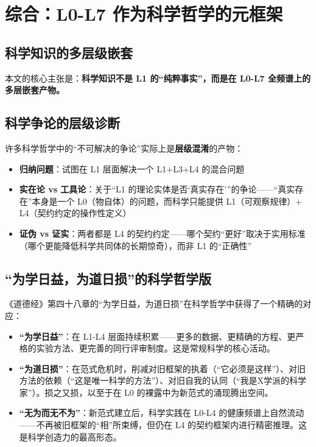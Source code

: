 \documentclass[UTF8,12pt,a4paper]{ctexart}
\begin{document}
\section{综合：L0-L7 作为科学哲学的元框架}

\subsection{科学知识的多层级嵌套}

本文的核心主张是：\textbf{科学知识不是 L1 的``纯粹事实''，而是在 L0-L7 全频谱上的多层嵌套产物。}

\subsection{科学争论的层级诊断}

许多科学哲学中的``不可解决的争论''实际上是\textbf{层级混淆}的产物：

\begin{itemize}[nosep]
    \item \textbf{归纳问题}：试图在 L1 层面解决一个 L1+L3+L4 的混合问题
    \item \textbf{实在论 vs 工具论}：关于``L1 的理论实体是否`真实存在'''的争论——``真实存在''本身是一个 L0（物自体）的问题，而科学只能提供 L1（可观察规律）+ L4（契约约定的操作性定义）
    \item \textbf{证伪 vs 证实}：两者都是 L4 的契约约定——哪个契约``更好''取决于实用标准（哪个更能降低科学共同体的长期惊奇），而非 L1 的``正确性''
\end{itemize}

\subsection{``为学日益，为道日损''的科学哲学版}

《道德经》第四十八章的``为学日益，为道日损''在科学哲学中获得了一个精确的对应：

\begin{itemize}[nosep]
    \item \textbf{``为学日益''}：在 L1-L4 层面持续积累——更多的数据、更精确的方程、更严格的实验方法、更完善的同行评审制度。这是常规科学的核心活动。
    \item \textbf{``为道日损''}：在范式危机时，削减对旧框架的执着（``它必须是这样''）、对旧方法的依赖（``这是唯一科学的方法''）、对旧自我的认同（``我是X学派的科学家''）。损之又损，以至于在 L0 的裸露中为新范式的涌现腾出空间。
    \item \textbf{``无为而无不为''}：新范式建立后，科学实践在 L0-L4 的健康频谱上自然流动——不再被旧框架的``相''所束缚，但仍在 L4 的契约框架内进行精密推理。这是科学创造力的最高形态。
\end{itemize}
\end{document}
